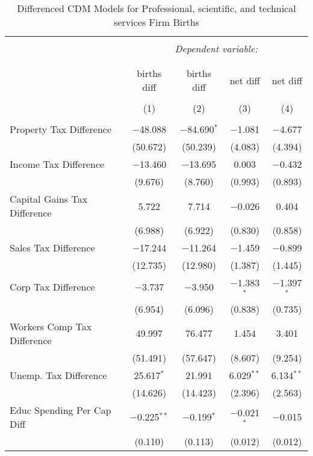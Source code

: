 
\begin{table}[!htbp] \centering 
  \caption{Differenced CDM Models for  Professional, scientific, and technical services Firm Births} 
  \label{} 
\begin{tabular}{@{\extracolsep{5pt}}lcccc} 
\\[-1.8ex]\hline 
\hline \\[-1.8ex] 
 & \multicolumn{4}{c}{\textit{Dependent variable:}} \\ 
\cline{2-5} 
\\[-1.8ex] & \multicolumn{4}{c}{ } \\ 
 & births diff & births diff & net diff & net diff \\ 
\\[-1.8ex] & (1) & (2) & (3) & (4)\\ 
\hline \\[-1.8ex] 
 Property Tax Difference & $-$48.088 & $-$84.690$^{*}$ & $-$1.081 & $-$4.677 \\ 
  & (50.672) & (50.239) & (4.083) & (4.394) \\ 
  Income Tax Difference & $-$13.460 & $-$13.695 & 0.003 & $-$0.432 \\ 
  & (9.676) & (8.760) & (0.993) & (0.893) \\ 
  Capital Gains Tax Difference & 5.722 & 7.714 & $-$0.026 & 0.404 \\ 
  & (6.988) & (6.922) & (0.830) & (0.858) \\ 
  Sales Tax Difference & $-$17.244 & $-$11.264 & $-$1.459 & $-$0.899 \\ 
  & (12.735) & (12.980) & (1.387) & (1.445) \\ 
  Corp Tax Difference & $-$3.737 & $-$3.950 & $-$1.383$^{*}$ & $-$1.397$^{*}$ \\ 
  & (6.954) & (6.096) & (0.838) & (0.735) \\ 
  Workers Comp Tax Difference & 49.997 & 76.477 & 1.454 & 3.401 \\ 
  & (51.491) & (57.647) & (8.607) & (9.254) \\ 
  Unemp. Tax Difference & 25.617$^{*}$ & 21.991 & 6.029$^{**}$ & 6.134$^{**}$ \\ 
  & (14.626) & (14.423) & (2.396) & (2.563) \\ 
  Educ Spending Per Cap Diff & $-$0.225$^{**}$ & $-$0.199$^{*}$ & $-$0.021$^{*}$ & $-$0.015 \\ 
  & (0.110) & (0.113) & (0.012) & (0.012) \\ 

\end{tabular}
\end{table}
